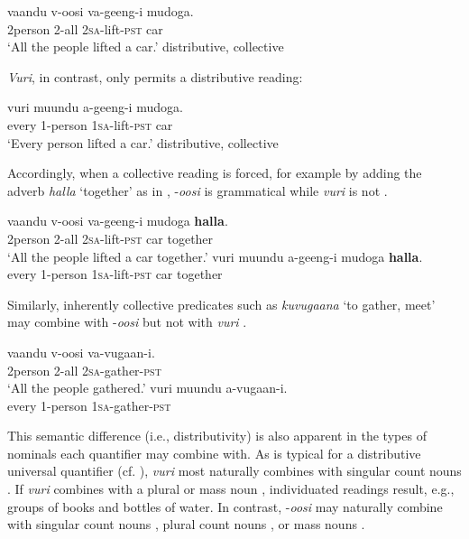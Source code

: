 \documentclass[output=paper]{langsci/langscibook}
\begin{document}
\ea\label{ex:landman:3}
\gll vaandu  v-oosi    va-geeng-i    mudoga.\\
     2person  2-all    2\textsc{sa}-lift-\textsc{pst}    car\\
\glt ‘All the people lifted a car.’  {\checkmark}distributive, {\checkmark}collective
\z

\textit{Vuri}, in contrast, only permits a distributive reading:

\ea\label{ex:landman:4}
\gll vuri  muundu  a-geeng-i    mudoga.\\
     every  1-person  1\textsc{sa}-lift-\textsc{pst}    car\\
\glt ‘Every person lifted a car.’  {\checkmark}distributive, {\texttimes}collective
\z

Accordingly, when a collective reading is forced, for example by adding the adverb \textit{halla} ‘together’ as in , -\textit{oosi} is grammatical  while \textit{vuri} is not .    

\ea\label{ex:landman:5} 
\ea\label{ex:landman:5a} 
\gll vaandu    v-oosi  va-geeng-i    mudoga  \textbf{halla}.\\
     2person  2-all  2\textsc{sa}-lift-\textsc{pst}  car    together\\
\glt ‘All the people lifted a car together.’
\ex\label{ex:landman:5b}
\gll *vuri  muundu  a-geeng-i  mudoga  \textbf{halla}.\\
     every  1-person  1\textsc{sa}-lift-\textsc{pst}  car    together\\
\z
\z

Similarly, inherently collective predicates such as \textit{kuvugaana} ‘to gather, meet’ may combine with -\textit{oosi}  but not with \textit{vuri} .

\ea\label{ex:landman:6}
\ea\label{ex:landman:6a}
\gll vaandu  v-oosi    va-vugaan-i.\\
     2person  2-all    2\textsc{sa}-gather-\textsc{pst}  \\
\glt ‘All the people gathered.’
\ex\label{ex:landman:6b}
\gll *vuri  muundu  a-vugaan-i.  \\
     every  1-person  1\textsc{sa}-gather-\textsc{pst}  \\
\z
\z

This semantic difference (i.e., distributivity) is also apparent in the types of nominals each quantifier may combine with. As is typical for a distributive universal quantifier (cf. \citealt{Gil1995}), \textit{vuri} most naturally combines with singular count nouns . If \textit{vuri} combines with a plural  or mass noun , individuated readings result, e.g., groups of books and bottles of water. In contrast, -\textit{oosi} may naturally combine with singular count nouns , plural count nouns , or mass nouns .
\end{document}
